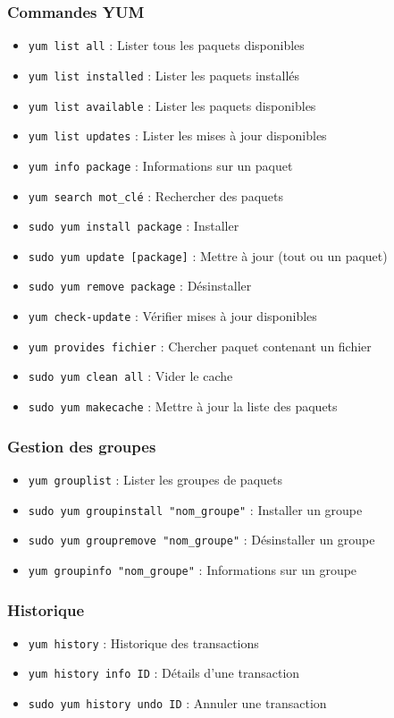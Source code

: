 \documentclass[12pt,a4paper]{article}
\begin{document}
\subsubsection{Commandes YUM}
\begin{itemize}
    \item \texttt{yum list all} : Lister tous les paquets disponibles
    \item \texttt{yum list installed} : Lister les paquets installés
    \item \texttt{yum list available} : Lister les paquets disponibles
    \item \texttt{yum list updates} : Lister les mises à jour disponibles
    \item \texttt{yum info package} : Informations sur un paquet
    \item \texttt{yum search mot\_clé} : Rechercher des paquets
    \item \texttt{sudo yum install package} : Installer
    \item \texttt{sudo yum update [package]} : Mettre à jour (tout ou un paquet)
    \item \texttt{sudo yum remove package} : Désinstaller
    \item \texttt{yum check-update} : Vérifier mises à jour disponibles
    \item \texttt{yum provides fichier} : Chercher paquet contenant un fichier
    \item \texttt{sudo yum clean all} : Vider le cache
    \item \texttt{sudo yum makecache} : Mettre à jour la liste des paquets
\end{itemize}

\subsubsection{Gestion des groupes}
\begin{itemize}
    \item \texttt{yum grouplist} : Lister les groupes de paquets
    \item \texttt{sudo yum groupinstall "nom\_groupe"} : Installer un groupe
    \item \texttt{sudo yum groupremove "nom\_groupe"} : Désinstaller un groupe
    \item \texttt{yum groupinfo "nom\_groupe"} : Informations sur un groupe
\end{itemize}

\subsubsection{Historique}
\begin{itemize}
    \item \texttt{yum history} : Historique des transactions
    \item \texttt{yum history info ID} : Détails d'une transaction
    \item \texttt{sudo yum history undo ID} : Annuler une transaction
\end{itemize}
\end{document}
